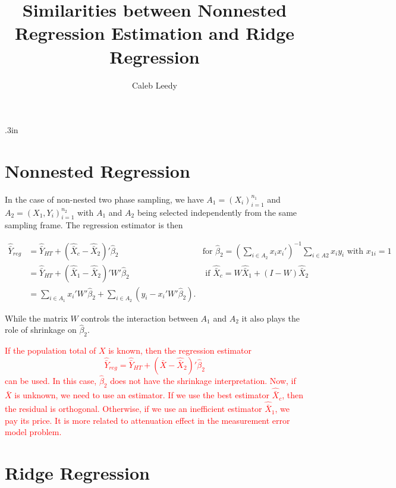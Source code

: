 \documentclass[12pt]{article}
\begin{document}
\title{Similarities between Nonnested Regression Estimation and Ridge Regression}
\author{Caleb Leedy}
\maketitle 

\baselineskip .3in

\section{Nonnested Regression}

In the case of non-nested two phase sampling, we have $A_1 = (X_i)_{i = 1}^{n_1}$
and $A_2 = (X_1, Y_i)_{i = 1}^{n_2}$ with $A_1$ and $A_2$ being selected
independently from the same sampling frame. The regression estimator is then

\begin{align*}
\hat{\bar{Y}}_{reg} 
  &= \hat{\bar{Y}}_{HT} + (\hat{\bar{X}}_c - \hat{\bar{X}}_2)' \hat \beta_2 
  & \text{for } \hat \beta_2 = \left(\sum_{i \in A_2} x_i x_i'\right)^{-1} 
    \sum_{i \in A2} x_i y_i \text{ with } x_{1i} = 1 \\
  &= \hat{\bar{Y}}_{HT} + (\hat{\bar{X}}_1 - \hat{\bar{X}}_2)'W'\hat \beta_2 
  & \text{ if } \hat{\bar{X}}_c = W \hat{\bar{X}}_1 + (I - W) \hat{\bar{X}}_2\\
  &= \sum_{i \in A_1} x_i' W' \hat \beta_2 + \sum_{i \in A_2} (y_i - x_i' W'
  \hat \beta_2).
\end{align*}

While the matrix $W$ controls the interaction between $A_1$ and $A_2$ it also
plays the role of shrinkage on $\hat \beta_2$.


\textcolor{red}{If the population total of $X$ is known, then the regression
  estimator 
  $$ \hat{\bar{Y}}_{reg} = \hat{\bar{Y}}_{HT} + ({\bar{X}} - \hat{\bar{X}}_2)' \hat \beta_2$$
  can be used. In this case, $\hat{\beta}_2$ does not have the shrinkage
  interpretation. Now, if $\bar{X}$ is unknown, we need to use an estimator. If
  we use the best estimator $\hat{\bar{X}}_c$, then the residual is orthogonal.
  Otherwise, if we use an inefficient estimator $\hat{\bar{X}}_1$, we pay its
  price. It is more related to attenuation effect in the measurement error model
  problem. 
}

\section{Ridge Regression}
\end{document}
